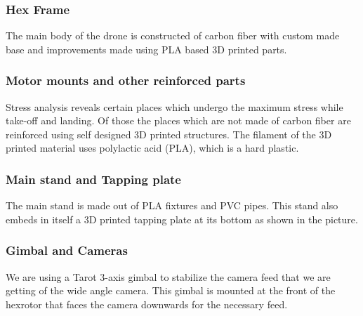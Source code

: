 \documentclass[12pt]{article}
\begin{document}
	\subsubsection{Hex Frame}
	The main body of the drone is constructed of carbon fiber with custom made base and improvements made using PLA based 3D printed parts. 
	\subsubsection{Motor mounts and other reinforced parts}
	Stress analysis reveals certain places which undergo the maximum stress while take-off and landing. Of those the places which are not made of carbon fiber are reinforced using self designed 3D printed structures. The filament of the 3D printed material uses polylactic acid (PLA), which is a hard plastic.
	\subsubsection{Main stand and Tapping plate}
	The main stand is made out of PLA fixtures and PVC pipes. This stand also embeds in itself a 3D printed tapping plate at its bottom as shown in the picture. 
	\subsubsection{Gimbal and Cameras}
	We are using a Tarot 3-axis gimbal to stabilize the camera feed that we are getting of the wide angle camera. This gimbal is mounted at the front of the hexrotor that faces the camera downwards for the necessary feed.
\end{document}
